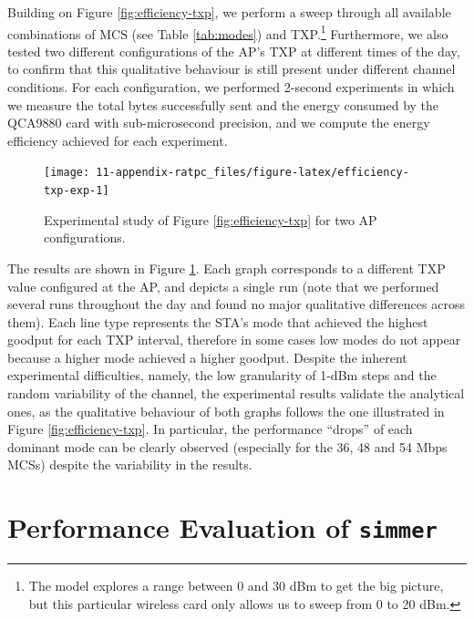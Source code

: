 \documentclass[twoside,nohyper]{tufte-book}
\theoremstyle{definition}
\theoremstyle{definition}
\theoremstyle{definition}
\theoremstyle{remark}
\begin{document}
Building on Figure \ref{fig:efficiency-txp}, we perform a sweep through
all available combinations of MCS (see Table \ref{tab:modes}) and
TXP.\footnote{The model explores a range between 0 and 30 dBm to get the
  big picture, but this particular wireless card only allows us to sweep
  from 0 to 20 dBm.} Furthermore, we also tested two different
configurations of the AP's TXP at different times of the day, to confirm
that this qualitative behaviour is still present under different channel
conditions. For each configuration, we performed 2-second experiments in
which we measure the total bytes successfully sent and the energy
consumed by the QCA9880 card with sub-microsecond precision, and we
compute the energy efficiency achieved for each experiment.




\begin{figure}

{\centering \texttt{[image: 11-appendix-ratpc\_files/figure-latex/efficiency-txp-exp-1]} 

}

\caption[Experimental study of Figure
\ref{fig:efficiency-txp} for two AP configurations.]{Experimental study of Figure
\ref{fig:efficiency-txp} for two AP configurations.}\label{fig:efficiency-txp-exp}
\end{figure}

The results are shown in Figure \ref{fig:efficiency-txp-exp}. Each graph
corresponds to a different TXP value configured at the AP, and depicts a
single run (note that we performed several runs throughout the day and
found no major qualitative differences across them). Each line type
represents the STA's mode that achieved the highest goodput for each TXP
interval, therefore in some cases low modes do not appear because a
higher mode achieved a higher goodput. Despite the inherent experimental
difficulties, namely, the low granularity of 1-dBm steps and the random
variability of the channel, the experimental results validate the
analytical ones, as the qualitative behaviour of both graphs follows the
one illustrated in Figure \ref{fig:efficiency-txp}. In particular, the
performance ``drops'' of each dominant mode can be clearly observed
(especially for the 36, 48 and 54 Mbps MCSs) despite the variability in
the results.

\chapter{\texorpdfstring{Performance Evaluation of
\texttt{simmer}}{Performance Evaluation of simmer}}\label{performance-evaluation-of-simmer}
\end{document}
